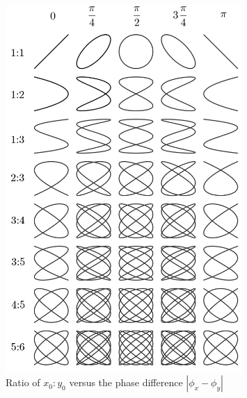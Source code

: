 \documentclass[letter, 10pts]{article}
\begin{document}
\begin{figure}[H]
	\centering
	\includegraphics[width=0.8\textwidth]{./ss/9/1.png}
	\caption{Ratio of $x_0:y_0$ versus the phase difference $|\phi_x - \phi_y|$}
	\label{fig:-ss-9-1-png}
\end{figure}



\newpage
\end{document}
